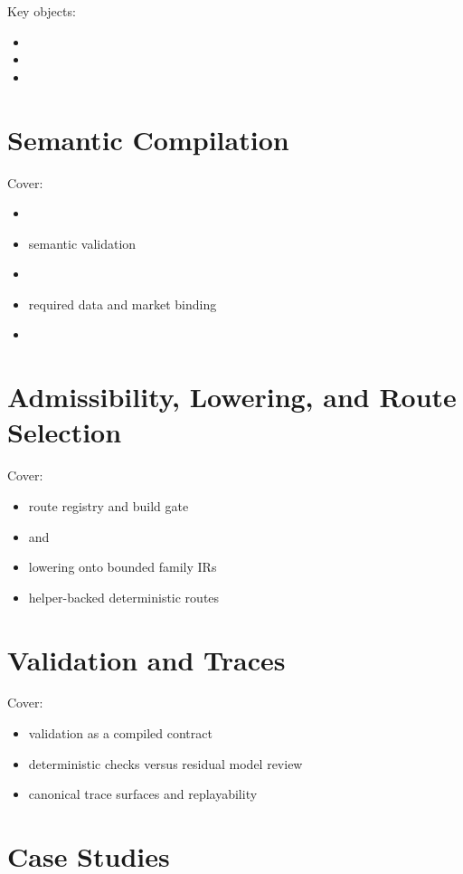 \documentclass[11pt]{article}
\begin{document}
Key objects:
\begin{itemize}
    \item \platformrequest{}
    \item {}
    \item {}
\end{itemize}

\section{Semantic Compilation}

Cover:
\begin{itemize}
    \item \semanticcontract{}
    \item semantic validation
    \item \valuationcontext{}
    \item required data and market binding
    \item \productir{}
\end{itemize}

\section{Admissibility, Lowering, and Route Selection}

Cover:
\begin{itemize}
    \item route registry and build gate
    \item \eventprogramir{} and \controlprogramir{}
    \item lowering onto bounded family IRs
    \item helper-backed deterministic routes
\end{itemize}

\section{Validation and Traces}

Cover:
\begin{itemize}
    \item validation as a compiled contract
    \item deterministic checks versus residual model review
    \item canonical trace surfaces and replayability
\end{itemize}

\section{Case Studies}
\end{document}
